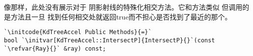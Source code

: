 像那样，此处没有展示对于
阴影射线的特殊化相交方法。它和方法类似
但调用的是方法且一旦
找到任何相交处就返回{\ttfamily true}而不担心是否找到了最近的那个。
\begin{lstlisting}
`\initcode{KdTreeAccel Public Methods}{=}`
bool `\initvar[KdTreeAccel::IntersectP]{IntersectP}{}`(const `\refvar{Ray}{}` &ray) const;
\end{lstlisting}